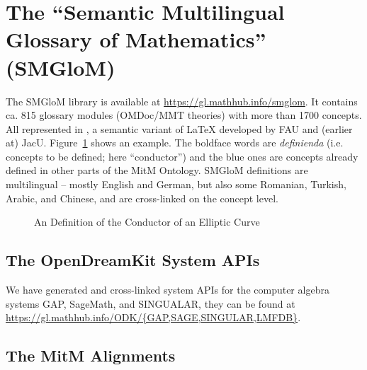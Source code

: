 \documentclass{deliverablereport}
\begin{document}
\section{The ``Semantic Multilingual Glossary of Mathematics'' (SMGloM)}\label{sec:smglom}

The SMGloM library is available at \url{https://gl.mathhub.info/smglom}. It contains
ca. 815 glossary modules (OMDoc/MMT theories) with more than 1700 concepts. All
represented in \sTeX, a semantic variant of {\LaTeX} developed by FAU and (earlier at)
JacU. Figure~\ref{fig:conductor} shows an example. The boldface words are \emph{definienda}
(i.e. concepts to be defined; here ``conductor'') and the blue ones are concepts already
defined in other parts of the MitM Ontology. SMGloM definitions are multilingual -- mostly
English and German, but also some Romanian, Turkish, Arabic, and Chinese, and are
cross-linked on the concept level.


\begin{figure}[ht]\centering
  \caption{An \sTeX Definition of the Conductor of an Elliptic
    Curve}\label{fig:conductor}
\end{figure}

\subsection{The OpenDreamKit System APIs}\label{sec:sysapis}

We have generated and cross-linked system APIs for the computer algebra systems GAP,
SageMath, and SINGUALAR, they can be found at
\url{https://gl.mathhub.info/ODK/{GAP,SAGE,SINGULAR,LMFDB}}.

\subsection{The MitM Alignments}
\end{document}
